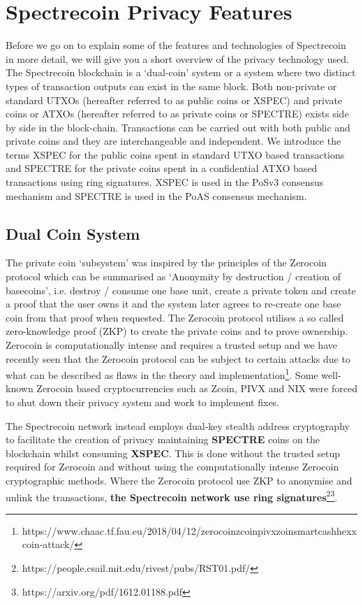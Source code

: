 \section{Spectrecoin Privacy Features}
Before we go on to explain some of the features and technologies of
Spectrecoin in more detail, we will give you a short overview of the
privacy technology used. The Spectrecoin blockchain is a ‘dual-coin’
system or a system where two distinct types of transaction outputs can
exist in the same block. Both non-private or standard UTXOs (hereafter
referred to as public coins or XSPEC) and private coins or ATXOs (hereafter
referred to as private coins or SPECTRE) exists side by side in the
block-chain. Transactions can be carried out with both public and private
coins and they are interchangeable and independent. We introduce the terms
XSPEC for the public coins spent in standard UTXO based transactions and
SPECTRE for the private coins spent in a confidential ATXO based
transactions using ring signatures. XSPEC is used in the PoSv3 consensus
mechanism and SPECTRE is used in the PoAS consensus mechanism.



\subsection{Dual Coin System}
The private coin ‘subsystem’ was inspired by the principles of the Zerocoin
protocol which can be summarised as ‘Anonymity by destruction / creation of
basecoins’, i.e. destroy / consume one base unit, create a private token
and create a proof that the user owns it and the system later agrees to
re-create one base coin from that proof when requested. The Zerocoin protocol
utilises a so called zero-knowledge proof (ZKP) to create the private coins
and to prove ownership. Zerocoin is computationally intense and requires a
trusted setup and we have recently seen that the Zerocoin protocol can be
subject to certain attacks due to what can be described as flaws in the
theory and 
implementation\footnote{https://www.chaac.tf.fau.eu/2018/04/12/zerocoinzcoinpivxzoinsmartcashhexxcoin-attack/}. 
Some well-known Zerocoin based cryptocurrencies
such as Zcoin, PIVX and NIX were forced to shut down their privacy system and
work to implement fixes.



The Spectrecoin network instead employs dual-key stealth address cryptography
to facilitate the creation of privacy maintaining \textbf{SPECTRE} coins on the
blockchain whilst consuming \textbf{XSPEC}. This is done without the trusted setup
required for Zerocoin and without using the computationally intense Zerocoin
cryptographic methods. Where the Zerocoin protocol use ZKP to anonymise and
unlink the transactions, 
\textbf{the Spectrecoin network use ring signatures}\footnote{https://people.csail.mit.edu/rivest/pubs/RST01.pdf/}\footnote{https://arxiv.org/pdf/1612.01188.pdf}.



